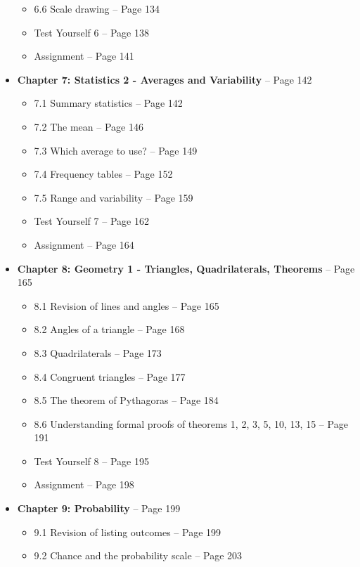 \documentclass{article}
\begin{document}
\begin{itemize}
\begin{itemize}
            \item 6.6 Scale drawing -- Page 134
            \item Test Yourself 6 -- Page 138
            \item Assignment -- Page 141
        \end{itemize}
    \item \textbf{Chapter 7: Statistics 2 - Averages and Variability} -- Page 142
        \begin{itemize}
            \item 7.1 Summary statistics -- Page 142
            \item 7.2 The mean -- Page 146
            \item 7.3 Which average to use? -- Page 149
            \item 7.4 Frequency tables -- Page 152
            \item 7.5 Range and variability -- Page 159
            \item Test Yourself 7 -- Page 162
            \item Assignment -- Page 164
        \end{itemize}
    \item \textbf{Chapter 8: Geometry 1 - Triangles, Quadrilaterals, Theorems} -- Page 165
        \begin{itemize}
            \item 8.1 Revision of lines and angles -- Page 165
            \item 8.2 Angles of a triangle -- Page 168
            \item 8.3 Quadrilaterals -- Page 173
            \item 8.4 Congruent triangles -- Page 177
            \item 8.5 The theorem of Pythagoras -- Page 184
            \item 8.6 Understanding formal proofs of theorems 1, 2, 3, 5, 10, 13, 15 -- Page 191
            \item Test Yourself 8 -- Page 195
            \item Assignment -- Page 198
        \end{itemize}
    \item \textbf{Chapter 9: Probability} -- Page 199
        \begin{itemize}
            \item 9.1 Revision of listing outcomes -- Page 199
            \item 9.2 Chance and the probability scale -- Page 203

\end{itemize}
\end{itemize}
\end{document}
